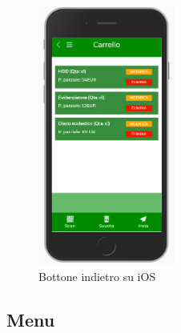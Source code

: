 \documentclass[12pt, a4paper, titlepage]{report}
\begin{document}
	\begin{figure}[H] 
		\centering
		\includegraphics[width=0.4\textwidth]{img/apple-cart}
		\caption{Bottone indietro su iOS}
		\label{fig:bottIndietro}
	\end{figure} 
	
	\subsection{Menu}
	
\end{document}
